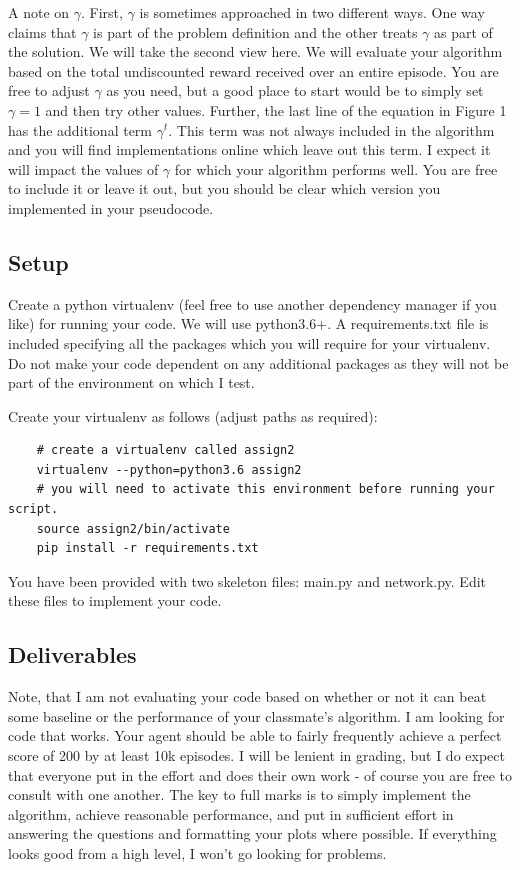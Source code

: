 \documentclass{article}
\begin{document}
A note on $\gamma$. First, $\gamma$ is sometimes approached in two different ways. One way claims that $\gamma$ is part of the problem definition and the other treats $\gamma$ as part of the solution. We will take the second view here. We will evaluate your algorithm based on the total undiscounted reward received over an entire episode. You are free to adjust $\gamma$ as you need, but a good place to start would be to simply set $\gamma=1$ and then try other values. Further, the last line of the equation in Figure 1 has the additional term $\gamma^t$. This term was not always included in the algorithm and you will find implementations online which leave out this term. I expect it will impact the values of $\gamma$ for which your algorithm performs well. You are free to include it or leave it out, but you should be clear which version you implemented in your pseudocode.

\subsection{Setup}

Create a python virtualenv (feel free to use another dependency manager if you like) for running your code. We will use python3.6+. A requirements.txt file is included specifying all the packages which you will require for your virtualenv. Do not make your code dependent on any additional packages as they will not be part of the environment on which I test.

Create your virtualenv as follows (adjust paths as required):

\begin{verbatim}
    # create a virtualenv called assign2
    virtualenv --python=python3.6 assign2
    # you will need to activate this environment before running your script.
    source assign2/bin/activate
    pip install -r requirements.txt
\end{verbatim}

You have been provided with two skeleton files: main.py and network.py. Edit these files to implement your code.

\subsection{Deliverables}

Note, that I am not evaluating your code based on whether or not it can beat some baseline or the performance of your classmate's algorithm. I am looking for code that works. Your agent should be able to fairly frequently achieve a perfect score of 200 by at least 10k episodes. I will be lenient in grading, but I do expect that everyone put in the effort and does their own work - of course you are free to consult with one another. The key to full marks is to simply implement the algorithm, achieve reasonable performance, and put in sufficient effort in answering the questions and formatting your plots where possible. If everything looks good from a high level, I won't go looking for problems.
\end{document}
